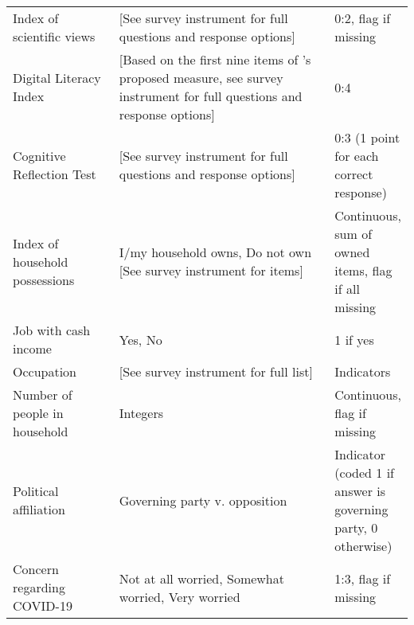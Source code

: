 \begin{table}[H]
\begin{adjustbox}{totalheight=.9\baselineskip, max width = \textwidth}
\begin{tabular}{p{0.3\linewidth}p{0.7\linewidth}p{0.25\linewidth}}
Index   of scientific views                 & [See   survey instrument for full questions and response options] & 0:2, flag if missing                     \\
Digital Literacy Index &  {[}Based on the first nine items of \cite{guessetal2020digital}'s  proposed measure, see  survey instrument for full questions and response options{]}& 0:4\\
Cognitive Reflection Test& {[}See   survey instrument for full questions and response options{]}& 0:3 (1 point for each correct response)\\
Index of household possessions%
&
  I/my household owns, Do not own [See survey instrument for items] &
  Continuous, sum of owned items, flag if all missing \\
Job   with cash income                      & Yes,   No                                                  & 1 if yes                \\
Occupation                                  & {[}See   survey instrument for full list{]}                & Indicators              \\
Number   of people in household             & Integers                                                   & Continuous, flag if missing              \\
Political affiliation & Governing party v. opposition & Indicator (coded 1 if answer is governing party, 0 otherwise)\\
Concern regarding COVID-19                  & Not at all worried, Somewhat worried,  Very   worried      & 1:3, flag if missing                     \\

\end{tabular}
\end{adjustbox}
\end{table}
